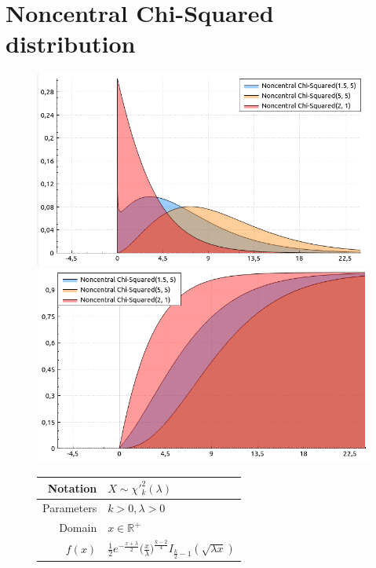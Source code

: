 \documentclass[a4paper,11pt]{article}
\theoremstyle{plain}
\theoremstyle{definition}
\newcommand{\MR}{\mathbb{R}}
\begin{document}
	\section{Noncentral Chi-Squared distribution}
	\begin{figure}[!htb]\centering
	\begin{minipage}{0.55\textwidth}
		\includegraphics[width=\linewidth, right]{noncentral_chi-squared_pdf}
		\captionsetup{labelformat=empty}
		\includegraphics[width=\linewidth, right]{noncentral_chi-squared_cdf}
		\captionsetup{labelformat=empty}
	\end{minipage}
	\begin{minipage}{0.4\textwidth}
		\begin{tabular}{| r | l |}
			\hline
			Notation & $X \sim \chi'^2_k(\lambda)$ \\
			\hline
			Parameters & $k > 0, \lambda > 0$ \\
			\hline
			Domain & $x \in \MR^+$  \\
			\hline
			$f(x)$ & $ \frac{1}{2} e^{-\frac{x+\lambda}{2}}  \Big( \frac{x}{\lambda} \Big)^{\frac{k-2}{4}} I_{\frac{k}{2}-1}(\sqrt{\lambda x})   $ \\

\end{tabular}
\end{minipage}
\end{figure}
\end{document}
